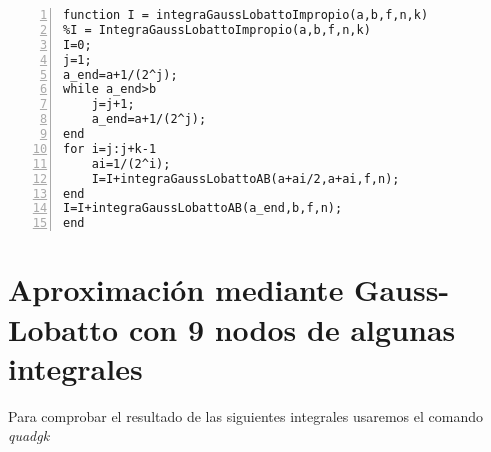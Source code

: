 \documentclass[a4paper]{article}
\begin{document}
 
\begin{lstlisting}[frame=single, numbers=left, style=Matlab-Pyglike]
function I = integraGaussLobattoImpropio(a,b,f,n,k)
%I = IntegraGaussLobattoImpropio(a,b,f,n,k)
I=0;
j=1;
a_end=a+1/(2^j);
while a_end>b
    j=j+1;
    a_end=a+1/(2^j);
end
for i=j:j+k-1
    ai=1/(2^i);
    I=I+integraGaussLobattoAB(a+ai/2,a+ai,f,n);
end
I=I+integraGaussLobattoAB(a_end,b,f,n);
end
\end{lstlisting}

\section{Aproximación mediante Gauss-Lobatto con 9 nodos de algunas integrales}
Para comprobar el resultado de las siguientes integrales usaremos el comando \textit{quadgk}
\end{document}
